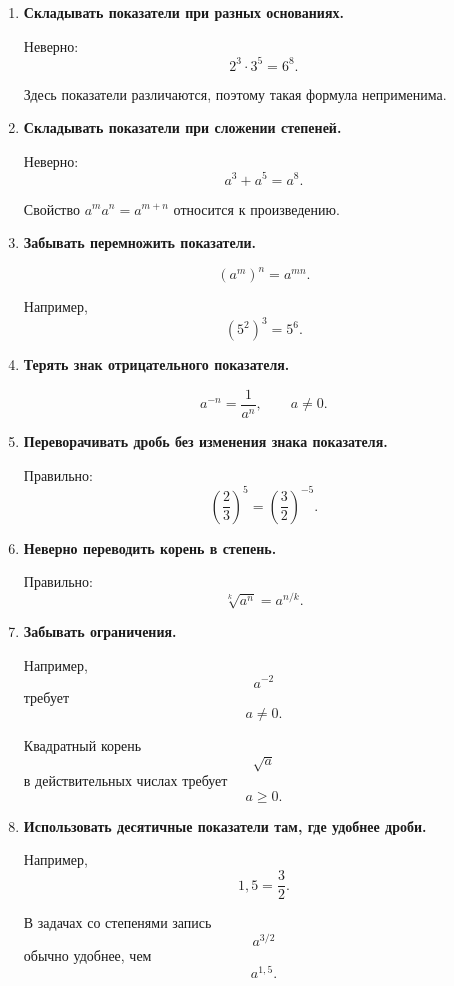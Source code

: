 \documentclass[a4paper,12pt]{article}
\begin{document}
\begin{enumerate}
    \item \textbf{Складывать показатели при разных основаниях.}

    Неверно:
    \[
    2^3\cdot3^5=6^8.
    \]

    Здесь показатели различаются, поэтому такая формула неприменима.

    \item \textbf{Складывать показатели при сложении степеней.}

    Неверно:
    \[
    a^3+a^5=a^8.
    \]

    Свойство \(a^m a^n=a^{m+n}\) относится к произведению.

    \item \textbf{Забывать перемножить показатели.}

    \[
    (a^m)^n=a^{mn}.
    \]

    Например,
    \[
    (5^2)^3=5^6.
    \]

    \item \textbf{Терять знак отрицательного показателя.}

    \[
    a^{-n}=\frac1{a^n},
    \qquad a\ne0.
    \]

    \item \textbf{Переворачивать дробь без изменения знака показателя.}

    Правильно:
    \[
    \left(\frac23\right)^5
    =
    \left(\frac32\right)^{-5}.
    \]

    \item \textbf{Неверно переводить корень в степень.}

    Правильно:
    \[
    \sqrt[k]{a^n}=a^{n/k}.
    \]

    \item \textbf{Забывать ограничения.}

    Например,
    \[
    a^{-2}
    \]
    требует
    \[
    a\ne0.
    \]

    Квадратный корень
    \[
    \sqrt a
    \]
    в действительных числах требует
    \[
    a\ge0.
    \]

    \item \textbf{Использовать десятичные показатели там, где удобнее дроби.}

    Например,
    \[
    1,5=\frac32.
    \]

    В задачах со степенями запись
    \[
    a^{3/2}
    \]
    обычно удобнее, чем
    \[
    a^{1,5}.
    \]
\end{enumerate}
\end{document}
